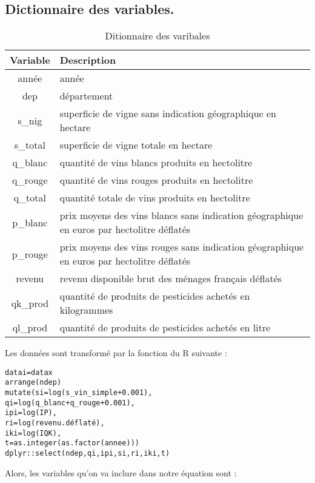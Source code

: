 \documentclass[11pt, a4paper]{article}
\begin{document}
\subsection{Dictionnaire des variables.}
\FloatBarrier
\begin{table}[!htbp]
  \centering
\begin{tabular}{c|l}
  \hline
  Variable & Description \\
  \hline
année & année \\
dep & département \\
s\_nig & superficie de vigne sans indication géographique en hectare \\
s\_total & superficie de vigne totale en hectare \\
q\_blanc & quantité de vins blancs produits en hectolitre \\
q\_rouge & quantité de vins rouges produits en hectolitre \\
q\_total & quantité totale de vins produits en hectolitre \\
p\_blanc & prix moyens des vins blancs sans indication géographique en euros par hectolitre déflatés \\
p\_rouge & prix moyens des vins rouges sans indication géographique en euros par hectolitre déflatés \\
revenu & revenu disponible brut des ménages français déflatés \\
qk\_prod & quantité de produits de pesticides achetés en kilogrammes \\
ql\_prod & quantité de produits de pesticides achetés en litre \\
\hline
\end{tabular}
\caption{Ditionnaire des varibales}
\end{table}
\FloatBarrier
Les données sont transformé par la fonction du R suivante :
\begin{alltt}
  datai = datax %>%
    arrange(ndep) %>%
    mutate(si = log(s_vin_simple + 0.001), 
        qi = log(q_blanc + q_rouge + 0.001), 
        ipi = log(IP),
        ri = log(revenu.déflaté),
        iki = log(IQK),
        t = as.integer(as.factor(annee))) %>%
    dplyr::select(ndep, qi, ipi, si, ri, iki, t)
\end{alltt}
\par
Alors, les variables qu'on va inclure dans notre équation sont :
\par
\FloatBarrier
\end{document}
